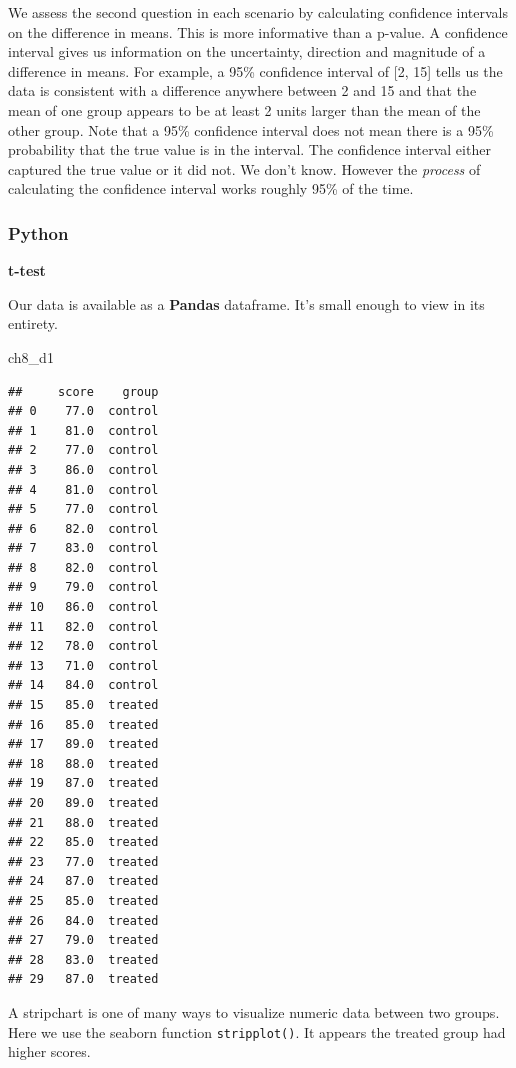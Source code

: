 \documentclass[
]{book}
\newenvironment{Shaded}{\begin{snugshade}}{\end{snugshade}}
\newcommand{\NormalTok}[1]{#1}
\begin{document}
We assess the second question in each scenario by calculating confidence intervals on the difference in means. This is more informative than a p-value. A confidence interval gives us information on the uncertainty, direction and magnitude of a difference in means. For example, a 95\% confidence interval of {[}2, 15{]} tells us the data is consistent with a difference anywhere between 2 and 15 and that the mean of one group appears to be at least 2 units larger than the mean of the other group. Note that a 95\% confidence interval does not mean there is a 95\% probability that the true value is in the interval. The confidence interval either captured the true value or it did not. We don't know. However the \emph{process} of calculating the confidence interval works roughly 95\% of the time.

\hypertarget{python-47}{%
\subsubsection*{Python}\label{python-47}}

\textbf{t-test}

Our data is available as a \textbf{Pandas} dataframe. It's small enough to view in its entirety.

\begin{Shaded}
\begin{Highlighting}[]
\NormalTok{ch8\_d1}
\end{Highlighting}
\end{Shaded}

\begin{verbatim}
##     score    group
## 0    77.0  control
## 1    81.0  control
## 2    77.0  control
## 3    86.0  control
## 4    81.0  control
## 5    77.0  control
## 6    82.0  control
## 7    83.0  control
## 8    82.0  control
## 9    79.0  control
## 10   86.0  control
## 11   82.0  control
## 12   78.0  control
## 13   71.0  control
## 14   84.0  control
## 15   85.0  treated
## 16   85.0  treated
## 17   89.0  treated
## 18   88.0  treated
## 19   87.0  treated
## 20   89.0  treated
## 21   88.0  treated
## 22   85.0  treated
## 23   77.0  treated
## 24   87.0  treated
## 25   85.0  treated
## 26   84.0  treated
## 27   79.0  treated
## 28   83.0  treated
## 29   87.0  treated
\end{verbatim}

A stripchart is one of many ways to visualize numeric data between two groups. Here we use the seaborn function \texttt{stripplot()}. It appears the treated group had higher scores.
\end{document}
